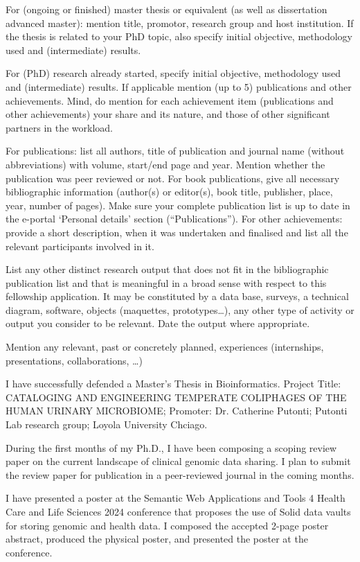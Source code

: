 {{For (ongoing or finished) master thesis or equivalent (as well as dissertation advanced master): mention title, promotor, research group and host institution. If the thesis is related to your PhD topic, also specify initial objective, methodology used and (intermediate) results.

For (PhD) research already started, specify initial objective, methodology used and (intermediate) results.
If applicable mention (up to 5) publications and other achievements. Mind, do mention for each achievement item (publications and other achievements) your share and its nature, and those of other significant partners in the workload.

For publications: list all authors, title of publication and journal name (without abbreviations) with volume, start/end page and year. Mention whether the publication was peer reviewed or not. For book publications, give all necessary bibliographic information (author(s) or editor(s), book title, publisher, place, year, number of pages).
Make sure your complete publication list is up to date in the e-portal ‘Personal details’ section (“Publications”).
For other achievements: provide a short description, when it was undertaken and finalised and list all the relevant participants involved in it.

List any other distinct research output that does not fit in the bibliographic publication list and that is meaningful in a broad sense with respect to this fellowship application. It may be constituted by a data base, surveys, a technical diagram, software, objects (maquettes, prototypes…), any other type of activity or output you consider to be relevant. Date the output where appropriate.

Mention any relevant, past or concretely planned, experiences (internships, presentations, collaborations, …)
}

I have successfully defended a Master's Thesis in Bioinformatics. Project Title: CATALOGING AND ENGINEERING TEMPERATE COLIPHAGES OF THE HUMAN
URINARY MICROBIOME; Promoter: Dr. Catherine Putonti; Putonti Lab research group; Loyola University Chciago. 


During the first months of my Ph.D., I have been composing a scoping review paper on the current landscape of clinical genomic data sharing.
I plan to submit the review paper for publication in a peer-reviewed journal in the coming months.

I have presented a poster at the Semantic Web Applications and Tools 4 Health Care and Life Sciences 2024 conference that proposes the use of Solid data vaults for storing genomic and health data.
I composed the accepted 2-page poster abstract, produced the physical poster, and presented the poster at the conference.

}
